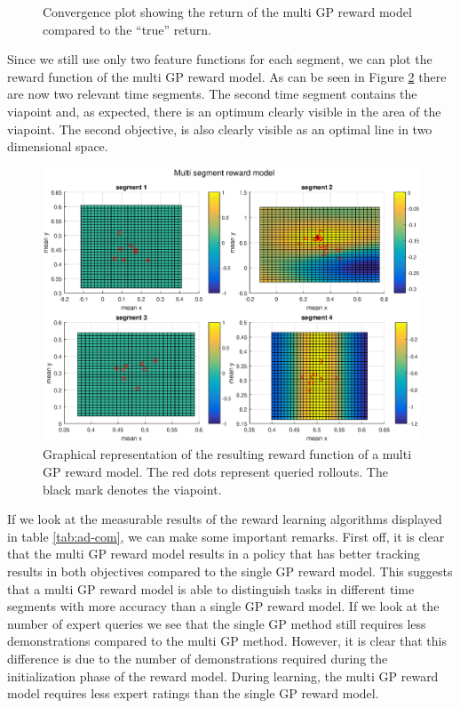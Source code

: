 \documentclass[mscThesis.tex]{subfiles}
\begin{document}
\begin{figure}[!htb]
\begin{minipage}{0.5\textwidth}
        \caption{Convergence plot showing the return of the multi GP reward model compared to the ``true'' return.}
        \label{fig:adx-multi-noise-con}
    \end{minipage}
\end{figure}

Since we still use only two feature functions for each segment, we can plot the reward function of the multi GP reward model. As can be seen in Figure \ref{fig:adx-multi-noise-reward} there are now two relevant time segments. The second time segment contains the viapoint and, as expected, there is an optimum clearly visible in the area of the viapoint. The second objective, is also clearly visible as an optimal line in two dimensional space.

\begin{figure}[!htb]
\centering
\includegraphics[width=\textwidth, keepaspectratio=1]{figures/results/advancedx/return_flat_multi_noise.eps}
\caption{Graphical representation of the resulting reward function of a multi GP reward model. The red dots represent queried rollouts. The black mark denotes the viapoint.}
\label{fig:adx-multi-noise-reward}
\end{figure}

If we look at the measurable results of the reward learning algorithms displayed in table \ref{tab:ad-com}, we can make some important remarks. First off,  it is clear that the multi GP reward model results in a policy that has better tracking results in both objectives compared to the single GP reward model. This suggests that a multi GP reward model is able to distinguish tasks in different time segments with more accuracy than a single GP reward model. If we look at the number of expert queries we see that the single GP method still requires less demonstrations compared to the multi GP method. However, it is clear that this difference is due to the number of demonstrations required during the initialization phase of the reward model. During learning, the multi GP reward model requires less expert ratings than the single GP reward model. 
\end{document}
